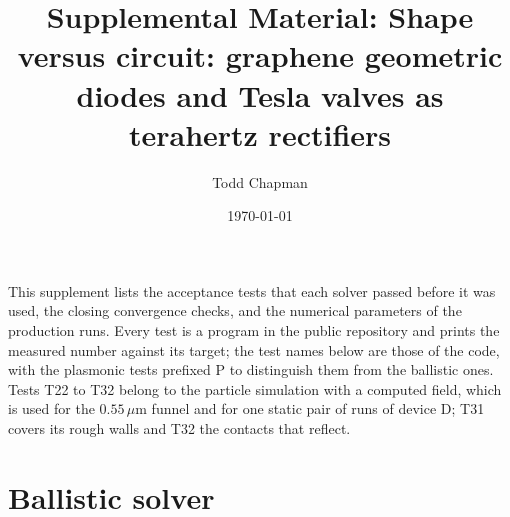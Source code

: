 \documentclass[aps,prapplied,onecolumn,superscriptaddress,floatfix]{revtex4-2}
\newcommand{\um}{\,\mu\mathrm{m}}
\begin{document}
\title{Supplemental Material: Shape versus circuit: graphene geometric diodes and Tesla valves as terahertz rectifiers}
\author{Todd Chapman}
\date{\today}
\maketitle

This supplement lists the acceptance tests that each solver passed before it
was used, the closing convergence checks, and the numerical parameters of the
production runs. Every test is a program in the public repository and prints
the measured number against its target; the test names below are those of the
code, with the plasmonic tests prefixed P to distinguish them from the
ballistic ones. Tests T22 to T32 belong to the particle simulation with a
computed field, which is used for the $0.55\um$ funnel and for one static
pair of runs of device D; T31 covers its rough walls and T32 the contacts
that reflect.

\section{Ballistic solver}
\end{document}
